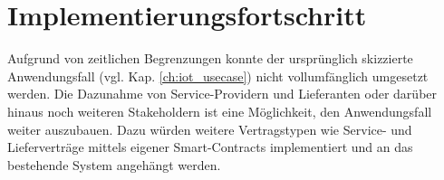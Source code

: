 \section{Implementierungsfortschritt}
\label{sec:results:progress}
Aufgrund von zeitlichen Begrenzungen konnte der ursprünglich skizzierte Anwendungsfall (vgl. Kap. \ref{ch:iot_usecase}) nicht vollumfänglich umgesetzt werden. Die Dazunahme von Service-Providern und Lieferanten oder darüber hinaus noch weiteren Stakeholdern ist eine Möglichkeit, den Anwendungsfall weiter auszubauen. Dazu würden weitere Vertragstypen wie Service- und Lieferverträge mittels eigener Smart-Contracts implementiert und an das bestehende System angehängt werden.

